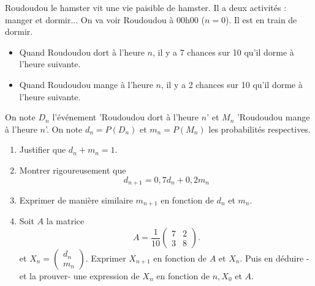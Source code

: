 \documentclass[a4paper, 11pt,reqno]{article}
\begin{document}
\vspace{1cm}
\begin{exercice}
Roudoudou le hamster vit une vie paisible de hamster. Il a deux activités : manger et  dormir... 
On va voir Roudoudou à 00h00 ($n=0$). Il est en train de dormir. 
\begin{itemize}
\item Quand Roudoudou dort à l'heure $n$, il y a 7 chances sur 10 qu'il dorme à l'heure suivante. %
\item Quand Roudoudou mange à l'heure $n$, il y a 2 chances sur 10 qu'il dorme à l'heure suivante.%
\end{itemize}


On note $D_n$ l'événement 'Roudoudou dort à l'heure $n$' et $M_n$ 'Roudoudou mange à l'heure $n$'. On note $d_n =P(D_n)$ et $m_n=P(M_n)$ les probabilités respectives. 


\begin{enumerate}
\item Justifier que $d_n+m_n=1$. 
\item Montrer rigoureusement que $$d_{n+1} =  0,7d_n+0,2m_n$$
\item Exprimer de manière similaire $m_{n+1} $ en fonction de $d_n$ et $m_n$. 

\item Soit $A$ la matrice $$A=\frac{1}{10}\left(\begin{array}{ccc}
7 & 2\\
3 & 8
\end{array}
\right).$$
et $X_n =\begin{pmatrix}
d_n\\
m_n
\end{pmatrix}$. 
Exprimer $X_{n+1}$ en fonction de $A$ et 
$X_n$. Puis en déduire - et la prouver- une expression de $X_n$ en fonction de $n, X_0$ et $A$.



\end{enumerate}
\end{exercice}
\end{document}

